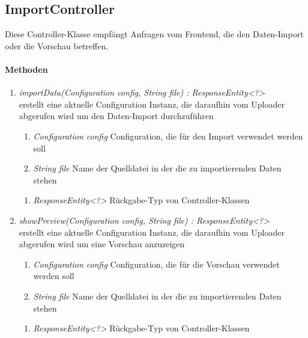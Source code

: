 \subsection{ImportController}
Diese Controller-Klasse empfängt Anfragen vom Frontend, die den Daten-Import oder die Vorschau betreffen.

\paragraph{Methoden}

\begin{enumerate}[+]
	\item \textit{ importData(Configuration config, String file) : ResponseEntity<?>}\\
	erstellt eine aktuelle Configuration Instanz, die daraufhin vom Uploader abgerufen wird um den Daten-Import durchzuführen
	
	\begin{enumerate}[$\bullet$]
		\item \textit{Configuration config} Configuration, die für den Import verwendet werden soll
		\item \textit{String file} Name der Quelldatei in der die zu importierenden Daten stehen
	\end{enumerate}
	\vspace{-0.2cm}
	\begin{enumerate}[$\circ$]
		\item \textit{ResponseEntity<?>} Rückgabe-Typ von Controller-Klassen
	\end{enumerate}
	
	\item \textit{ showPreview(Configuration config, String file) : ResponseEntity<?>}\\
	erstellt eine aktuelle Configuration Instanz, die daraufhin vom Uploader abgerufen wird um eine Vorschau anzuzeigen
	
	\begin{enumerate}[$\bullet$]
		\item \textit{Configuration config} Configuration, die für die Vorschau verwendet werden soll
		\item \textit{String file} Name der Quelldatei in der die zu importierenden Daten stehen
	\end{enumerate}
	\vspace{-0.2cm}
	\begin{enumerate}[$\circ$]
		\item \textit{ResponseEntity<?>} Rückgabe-Typ von Controller-Klassen
	\end{enumerate}
\end{enumerate}